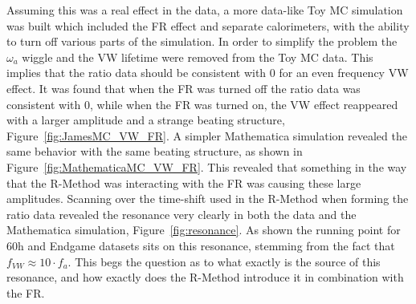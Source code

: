 \documentclass[12pt,letterpaper]{article}
\newcommand{\figref}[1]{Figure~\ref{#1}}
\def\wa{$\omega_{a}$\xspace}
\begin{document}
Assuming this was a real effect in the data, a more data-like Toy MC simulation was built which included the FR effect and separate calorimeters, with the ability to turn off various parts of the simulation. In order to simplify the problem the \wa wiggle and the VW lifetime were removed from the Toy MC data. This implies that the ratio data should be consistent with 0 for an even frequency VW effect. It was found that when the FR was turned off the ratio data was consistent with 0, while when the FR was turned on, the VW effect reappeared with a larger amplitude and a strange beating structure, \figref{fig:JamesMC_VW_FR}. A simpler Mathematica simulation revealed the same behavior with the same beating structure, as shown in \figref{fig:MathematicaMC_VW_FR}. This revealed that something in the way that the R-Method was interacting with the FR was causing these large amplitudes. Scanning over the time-shift used in the R-Method when forming the ratio data revealed the resonance very clearly in both the data and the Mathematica simulation, \figref{fig:resonance}. As shown the running point for 60h and Endgame datasets sits on this resonance, stemming from the fact that $f_{VW} \approx 10 \cdot f_{a}$. This begs the question as to what exactly is the source of this resonance, and how exactly does the R-Method introduce it in combination with the FR.
\end{document}
